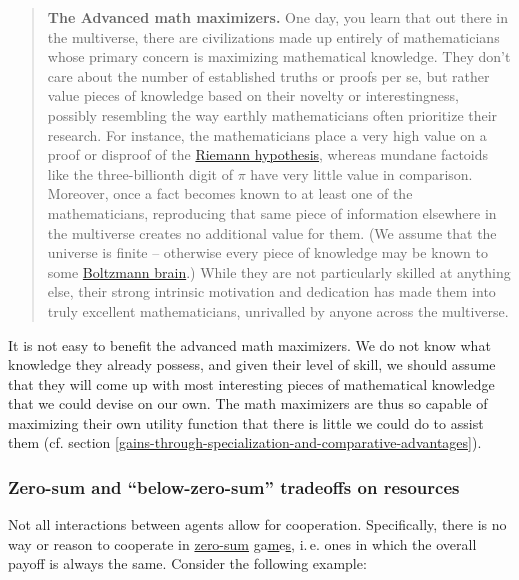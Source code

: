 \begin{quote}
\textbf{The Advanced math maximizers.} One day, you learn that out there
in the multiverse, there are civilizations made up entirely of
mathematicians whose primary concern is maximizing mathematical
knowledge. They don't care about the number of established truths or
proofs per se, but rather value pieces of knowledge based on their
novelty or interestingness, possibly resembling the way earthly
mathematicians often prioritize their research. For instance, the
mathematicians place a very high value on a proof or disproof of the
\href{https://en.wikipedia.org/wiki/Riemann_hypothesis}{Riemann
hypothesis}, whereas mundane factoids like the three-billionth digit of
\(\pi\) have very little value in comparison. Moreover, once a fact
becomes known to at least one of the mathematicians, reproducing that
same piece of information elsewhere in the multiverse creates no
additional value for them. (We assume that the universe is finite --
otherwise every piece of knowledge may be known to some
\href{https://en.wikipedia.org/wiki/Boltzmann_brain}{Boltzmann
brain}.) While they are not particularly skilled at anything else,
their strong intrinsic motivation and dedication has made them into
truly excellent mathematicians, unrivalled by anyone across the
multiverse.
\end{quote}

It is not easy to benefit the advanced math maximizers. We do not know
what knowledge they already possess, and given their level of skill, we
should assume that they will come up with most interesting pieces of
mathematical knowledge that we could devise on our own. The math
maximizers are thus so capable of maximizing their own utility function
that there is little we could do to assist them (cf. section
\ref{gains-through-specialization-and-comparative-advantages}).

\hypertarget{zero-sum-and-below-zero-sum-tradeoffs-on-resources}{\subsubsection{Zero-sum
and ``below-zero-sum'' tradeoffs on
resources}\label{zero-sum-and-below-zero-sum-tradeoffs-on-resources}}

Not all interactions between agents allow for cooperation. Specifically,
there is no way or reason to cooperate in
\href{https://en.wikipedia.org/wiki/Zero-sum_game}{zero-sum}
\href{https://en.wikipedia.org/wiki/Zero-sum_game}{g}a\href{https://en.wikipedia.org/wiki/Zero-sum_game}{m}e\href{https://en.wikipedia.org/wiki/Zero-sum_game}{s},
i.\,e. ones in which the overall payoff is always the same. Consider the
following example:

